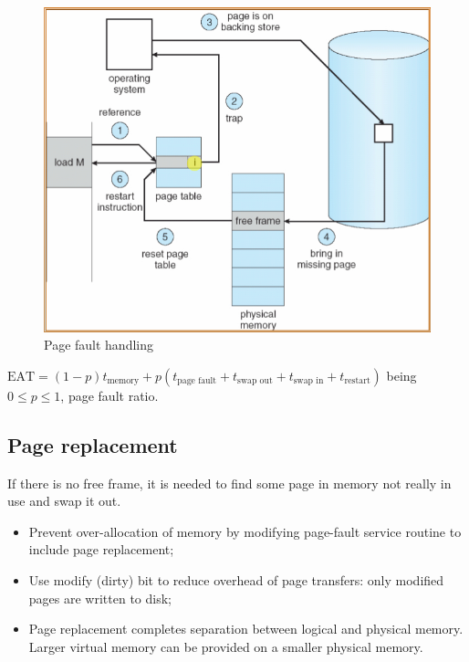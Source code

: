 \begin{figure}[hbtp]
\centering
\includegraphics[scale=0.4]{images/virtual_memory/page_fault.jpg}
\caption{Page fault handling}
\end{figure}

$\text{EAT} = (1-p) t_{\text{memory}} + p (t_{\text{page fault}} + t_{\text{swap out}} + t_{\text{swap in}} + t_{\text{restart}})$ being $ 0 \le p \le 1 $, page fault ratio.

\subsection{Page replacement}
If there is no free frame, it is needed to find some page in memory not really in use and swap it out.
\begin{itemize}
\item Prevent over-allocation of memory by modifying page-fault service routine to include page replacement;
\item Use modify (dirty) bit to reduce overhead of page transfers: only modified pages are written to disk;
\item Page replacement completes separation between logical and physical memory. Larger virtual memory can be provided on a smaller physical memory.
\end{itemize}

